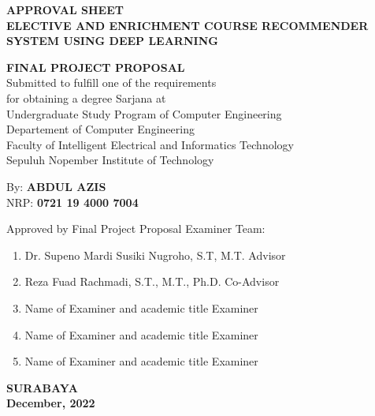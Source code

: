 {
\begin{center}
    \uppercase{\textbf{\large Approval Sheet}} \\

    \vspace*{10mm}
    \uppercase{\textbf{Elective and Enrichment Course Recommender System using Deep Learning}}
    \vspace*{10mm}

    {
        \uppercase{\textbf{Final Project Proposal}} \\
        Submitted to fulfill one of the requirements                  \\
        for obtaining a degree Sarjana at                             \\
        Undergraduate Study Program of Computer Engineering       \\
        Departement of Computer Engineering                            \\
        Faculty of Intelligent Electrical and Informatics Technology  \\
        Sepuluh Nopember Institute of Technology                           \\
    }

    \vspace*{1.5cm}
    By: \textbf{\uppercase{Abdul Azis}}                                       \\
    NRP: \textbf{0721 19 4000 7004}                               \\
    \vspace*{1.5cm}

    Approved by Final Project Proposal Examiner Team:             \\
    \vspace*{5mm}

    \begin{enumerate}
        \setlength\itemsep{1.5em}
        \item Dr. Supeno Mardi Susiki Nugroho, S.T, M.T. \hfill Advisor
        \item Reza Fuad Rachmadi, S.T., M.T., Ph.D. \hfill Co-Advisor
        \item Name of Examiner and academic title \hfill Examiner
        \item Name of Examiner and academic title \hfill Examiner
        \item Name of Examiner and academic title \hfill Examiner
    \end{enumerate}

    \vspace*{1.5cm}
    \uppercase{\textbf{surabaya}}                      \\
    \textbf{December, 2022}                               \\

\end{center}
}
